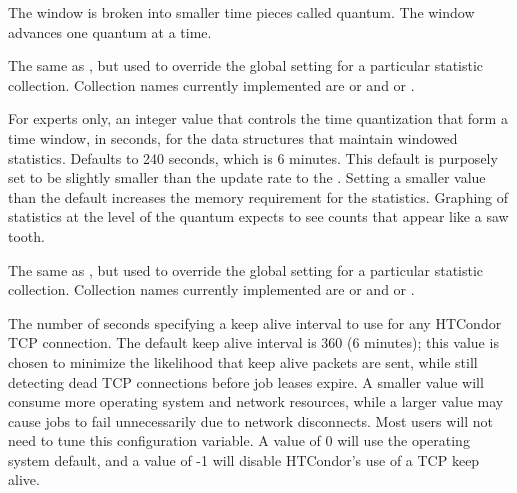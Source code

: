 \begin{description}
  The window is broken into smaller time pieces called quantum.
  The window advances one quantum at a time.

\label{param:StatisticsWindowSecondsCollection}
\item[\Macro{STATISTICS\_WINDOW\_SECONDS\_<collection>}]
  The same as , 
  but used to 
  override the global setting for a particular statistic collection.  
  Collection names currently implemented are  or 
  and  or .

\label{param:StatisticsWindowQuantum}
\item[\Macro{STATISTICS\_WINDOW\_QUANTUM}]
  For experts only,
  an integer value that controls the time quantization that form a
  time window, 
  in seconds, for the data structures that maintain windowed statistics.
  Defaults to 240 seconds, which is 6 minutes.
  This default is purposely set to be slightly smaller than the update
  rate to the . 
  Setting a smaller value than the default increases the memory requirement
  for the statistics.
  Graphing of statistics at the level of the quantum
  expects to see counts that appear like a saw tooth. 

\label{param:StatisticsWindowQuantumCollection}
\item[\Macro{STATISTICS\_WINDOW\_QUANTUM\_<collection>}]
  The same as , 
  but used to 
  override the global setting for a particular statistic collection.  
  Collection names currently implemented are  or 
  and  or .

\label{param:TcpKeepaliveInterval}
\item[\Macro{TCP\_KEEPALIVE\_INTERVAL}]
  The number of seconds specifying a keep alive interval
  to use for any HTCondor TCP connection.
  The default keep alive interval is 360 (6 minutes); 
  this value is chosen to minimize the likelihood that keep alive packets 
  are sent,
  while still detecting dead TCP connections before job leases expire.
  A smaller value
  will consume more operating system and network resources, 
  while a larger value may cause jobs to fail unnecessarily due to 
  network disconnects.  
  Most users will not need to tune this configuration variable.
  A value of 0 will use the operating system default,
  and a value of -1 will disable HTCondor's use of a TCP keep alive.

\end{description}


